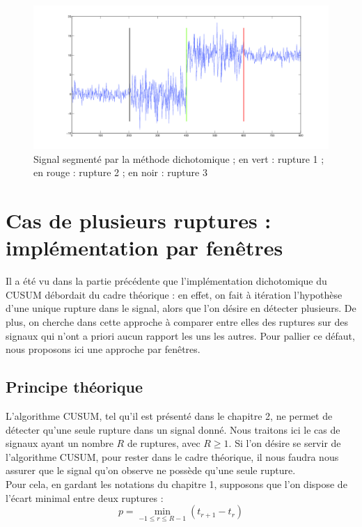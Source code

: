 \documentclass[french,11pt,notitlepage]{report}
\begin{document}
	\begin{figure}[hp]
		\includegraphics[width=\linewidth,height=.24\textheight]{tada_dikt.png}
		\caption{Signal segmenté par la méthode dichotomique ; en vert : rupture 1 ; en rouge : rupture 2 ; en noir : rupture 3}
		\label{tada_dikt}
	\end{figure}
		
		
		
	\chapter{Cas de plusieurs ruptures : implémentation par fenêtres}	
	
	
	
	Il a été vu dans la partie précédente que l'implémentation dichotomique du CUSUM débordait du cadre théorique :
	en effet, on fait à itération l'hypothèse d'une unique rupture dans le signal, alors que l'on désire en détecter plusieurs.
	De plus, on cherche dans cette approche à comparer entre elles des ruptures sur des signaux qui n'ont a priori aucun rapport les uns les autres.
	Pour pallier ce défaut, nous proposons ici une approche par fenêtres.
	
	
	\section{Principe théorique}
	
	
	L'algorithme CUSUM, tel qu'il est présenté dans le chapitre 2, ne permet de détecter qu'une seule rupture dans un signal donné.
	Nous traitons ici le cas de signaux ayant un nombre $R$ de ruptures, avec $R \geq 1$.
	Si l'on désire se servir de l'algorithme CUSUM, pour rester dans le cadre théorique,
	il nous faudra nous assurer que le signal qu'on observe ne possède qu'une seule rupture.
	\\
	
	Pour cela, en gardant les notations du chapitre 1, supposons que l'on dispose de l'écart minimal entre deux ruptures :
	\begin{equation*}
		p = \min_{-1 \leq r \leq R-1} (t_{r+1} - t_r)
	\end{equation*}
	
\end{document}
